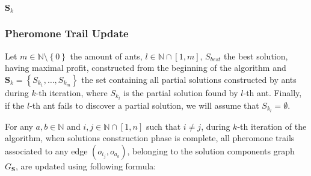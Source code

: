 \documentclass[12pt,a4paper]{report}
\newcommand{\N}{\mathbb{N}}
\newcommand{\SetMinusZero}{\setminus \left\{0\right\}}
\newcommand{\SetFromOneTo}[1]{\N \cap \left[1,#1\right]}
\begin{document}
\begin{algorithm}
	
	\Return $\textbf{S}_k$
\end{algorithm}

\subsubsection{Pheromone Trail Update}

Let $m \in \N \SetMinusZero$ the amount of ants, $l \in \SetFromOneTo{m}$, $S_{best}$ the best solution, having maximal profit, constructed from the beginning of the algorithm and $\textbf{S}_k = \left\{S_{k_1}, \ldots, S_{k_m} \right\}$ the set containing all partial solutions constructed by ants during $k$-th iteration, where $S_{k_l}$ is the partial solution found by $l$-th ant. Finally, if the $l$-th ant fails to discover a partial solution, we will assume that $S_{k_l} = \emptyset$. 

For any $a,b \in \N$ and $i,j \in \SetFromOneTo{n}$ such that $i \neq j$, during $k$-th iteration of the algorithm, when solutions construction phase is complete, all pheromone trails associated to any edge $(o_{i_j}, o_{a_b})$, belonging to the solution components graph $G_{\textbf{S}}$, are updated using following formula:
\end{document}
